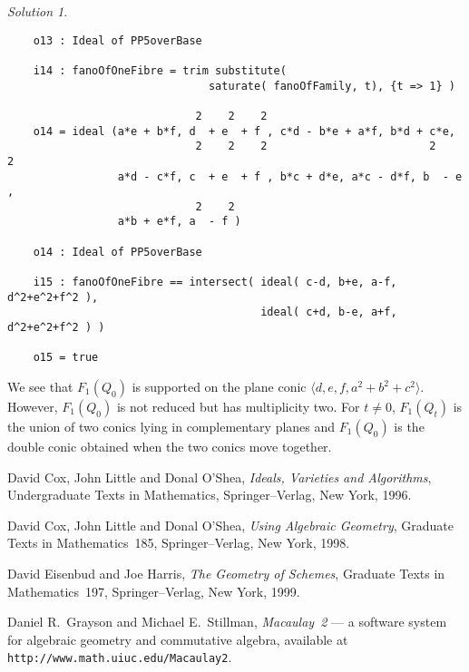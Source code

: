 \documentclass[12pt,noamsfonts]{amsart}
\theoremstyle{definition}
\theoremstyle{remark}
\newtheorem*{solution}{Solution}
\begin{document}
\begin{solution}
{\begin{verbatim}
    o13 : Ideal of PP5overBase
    
    i14 : fanoOfOneFibre = trim substitute( 
                               saturate( fanoOfFamily, t), {t => 1} )
    
                             2    2    2                  
    o14 = ideal (a*e + b*f, d  + e  + f , c*d - b*e + a*f, b*d + c*e,  
                             2    2    2                         2    2  
                 a*d - c*f, c  + e  + f , b*c + d*e, a*c - d*f, b  - e , 
                             2    2
                 a*b + e*f, a  - f )

    o14 : Ideal of PP5overBase
    
    i15 : fanoOfOneFibre == intersect( ideal( c-d, b+e, a-f, d^2+e^2+f^2 ),
                                       ideal( c+d, b-e, a+f, d^2+e^2+f^2 ) )
          
    o15 = true

\end{verbatim}}
\noindent We see that $F_{1}(Q_{0}) $ is
supported on the plane conic $\langle d, e, f, a^{2}+b^{2}+c^{2}
\rangle$.  However, $F_{1}(Q_{0})$ is not reduced but has multiplicity
two. For $t \neq 0$, $F_{1}(Q_{t})$ is the union of
two conics lying in complementary planes and $F_{1}(Q_{0})$ is the
double conic obtained when the two conics move together.
\end{solution}

\providecommand{\bysame}{\leavevmode\hbox to3em{\hrulefill}\thinspace}
\begin{thebibliography}{CLO}

David Cox, John Little and Donal O'Shea,
 \emph{Ideals, Varieties and Algorithms},
Undergraduate Texts in Mathematics,
Springer--Verlag,   New York, 1996.

David Cox, John Little and Donal O'Shea,
 \emph{Using Algebraic Geometry},
  Graduate Texts in Mathematics~185, Springer--Verlag,
  New York, 1998.

David Eisenbud and Joe Harris, \emph{The Geometry of Schemes},
  Graduate Texts in Mathematics~197, Springer--Verlag,
  New York, 1999.

Daniel R.~Grayson and Michael E.~Stillman, \emph{Macaulay~2}
  --- a software system for algebraic geometry and commutative algebra,
  available at {\tt http://www.math.uiuc.edu/Macaulay2}.

\end{thebibliography}
\end{document}
